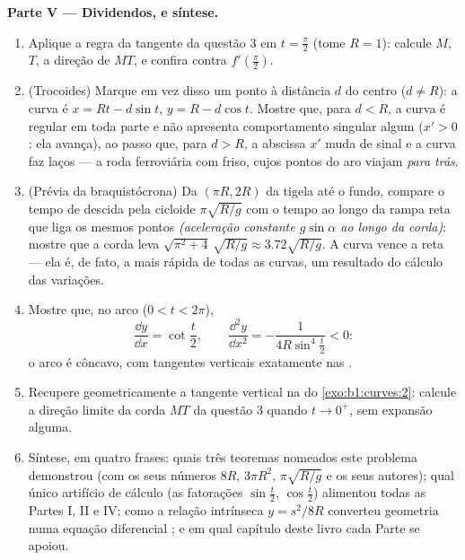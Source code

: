 \begin{problem}
\medskip
\noindent\textbf{Parte V --- Dividendos, e síntese.}
\begin{enumerate}[resume]
  \item Aplique a regra da tangente da questão 3 em $t =
        \frac\pi2$ (tome
        $R = 1$): calcule $M$, $T$, a direção de $MT$, e confira
        contra $f'(\frac\pi2)$.
  \item (Trocoides) Marque em vez disso um ponto à distância $d$ do
        centro ($d \neq R$): a curva é $x = Rt -
        d\sin t$, $y = R - d\cos t$. Mostre que, para
        $d < R$, a curva é regular em toda parte e não apresenta
        comportamento singular algum ($x' > 0$: ela avança), ao passo
        que, para $d
        > R$, a abscissa $x'$ muda de sinal e a curva faz
        laços --- a roda ferroviária com friso, cujos pontos do aro
        viajam \emph{para trás}.
  \item (Prévia da braquistócrona) Da  $(\pi R, 2R)$ da tigela até o
        fundo, compare o tempo de descida pela cicloide $\pi\sqrt{R/g}$ com o
        tempo ao longo da rampa reta que liga os mesmos pontos
        \emph{(aceleração constante $g\sin\alpha$ ao longo da corda)}: mostre
        que a corda leva $\sqrt{\pi^2 + 4}\,\sqrt{R/g} \approx 3.72\sqrt{R/g}$. A curva vence a reta --- ela é, de
        fato, a mais rápida de todas as curvas, um resultado do
        cálculo das variações.
  \item Mostre que, no arco ($0 < t < 2\pi$),
        \[
        \frac{\dd y}{\dd x} = \cot\frac t2,
        \qquad
        \frac{\dd^2 y}{\dd x^2} =
        -\frac{1}{4R\sin^4\frac t2} < 0 :
        \]
        o arco é côncavo, com tangentes verticais exatamente nas
        .
  \item Recupere geometricamente a tangente vertical na  do
        \cref{exo:b1:curves:2}: calcule a direção limite da corda $MT$ da questão 3
        quando $t \to
        0^{+}$, sem expansão alguma.
  \item Síntese, em quatro frases: quais três teoremas nomeados este
        problema demonstrou (com os seus números $8R$, $3\pi
        R^2$, $\pi\sqrt{R/g}$ e
        os seus autores); qual único artifício de cálculo (as
        fatorações $\sin\frac t2$, $\cos\frac t2$) alimentou todas as Partes I, II e
        IV; como a relação intrínseca $y = s^2/8R$ converteu geometria numa
        equação diferencial ; e em qual capítulo deste livro
        cada Parte se apoiou.
\end{enumerate}
\end{problem}
